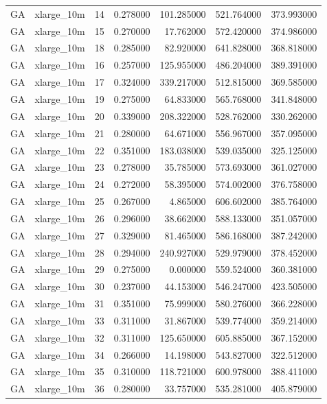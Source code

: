 \begin{tabular}{llrrrrr}
GA & xlarge_10m & 14 & 0.278000 & 101.285000 & 521.764000 & 373.993000 \\
GA & xlarge_10m & 15 & 0.270000 & 17.762000 & 572.420000 & 374.986000 \\
GA & xlarge_10m & 18 & 0.285000 & 82.920000 & 641.828000 & 368.818000 \\
GA & xlarge_10m & 16 & 0.257000 & 125.955000 & 486.204000 & 389.391000 \\
GA & xlarge_10m & 17 & 0.324000 & 339.217000 & 512.815000 & 369.585000 \\
GA & xlarge_10m & 19 & 0.275000 & 64.833000 & 565.768000 & 341.848000 \\
GA & xlarge_10m & 20 & 0.339000 & 208.322000 & 528.762000 & 330.262000 \\
GA & xlarge_10m & 21 & 0.280000 & 64.671000 & 556.967000 & 357.095000 \\
GA & xlarge_10m & 22 & 0.351000 & 183.038000 & 539.035000 & 325.125000 \\
GA & xlarge_10m & 23 & 0.278000 & 35.785000 & 573.693000 & 361.027000 \\
GA & xlarge_10m & 24 & 0.272000 & 58.395000 & 574.002000 & 376.758000 \\
GA & xlarge_10m & 25 & 0.267000 & 4.865000 & 606.602000 & 385.764000 \\
GA & xlarge_10m & 26 & 0.296000 & 38.662000 & 588.133000 & 351.057000 \\
GA & xlarge_10m & 27 & 0.329000 & 81.465000 & 586.168000 & 387.242000 \\
GA & xlarge_10m & 28 & 0.294000 & 240.927000 & 529.979000 & 378.452000 \\
GA & xlarge_10m & 29 & 0.275000 & 0.000000 & 559.524000 & 360.381000 \\
GA & xlarge_10m & 30 & 0.237000 & 44.153000 & 546.247000 & 423.505000 \\
GA & xlarge_10m & 31 & 0.351000 & 75.999000 & 580.276000 & 366.228000 \\
GA & xlarge_10m & 33 & 0.311000 & 31.867000 & 539.774000 & 359.214000 \\
GA & xlarge_10m & 32 & 0.311000 & 125.650000 & 605.885000 & 367.152000 \\
GA & xlarge_10m & 34 & 0.266000 & 14.198000 & 543.827000 & 322.512000 \\
GA & xlarge_10m & 35 & 0.310000 & 118.721000 & 600.978000 & 388.411000 \\
GA & xlarge_10m & 36 & 0.280000 & 33.757000 & 535.281000 & 405.879000 \\

\end{tabular}

